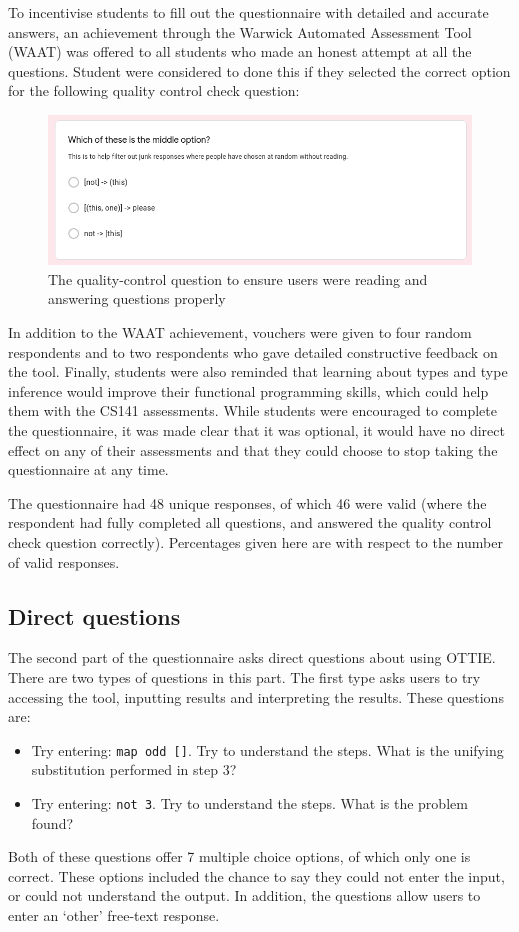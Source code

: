 \documentclass[a4paper,fleqn,oneside,12pt]{report}
\begin{document}
To incentivise students to fill out the questionnaire with detailed and accurate answers, an achievement through the Warwick Automated Assessment Tool (WAAT) was offered to all students who made an honest attempt at all the questions. Student were considered to done this if they selected the correct option for the following quality control check question:

{\centering \begin{figure}[h!]
  \centering
  \includegraphics[width=0.9\linewidth]{images/image32.png}
  \caption{The quality-control question to ensure users were reading and answering questions properly}
\end{figure} \par}

In addition to the WAAT achievement, vouchers were given to four random respondents and to two respondents who gave detailed constructive feedback on the tool. Finally, students were also reminded that learning about types and type inference would improve their functional programming skills, which could help them with the CS141 assessments. While students were encouraged to complete the questionnaire, it was made clear that it was optional, it would have no direct effect on any of their assessments and that they could choose to stop taking the questionnaire at any time.

The questionnaire had 48 unique responses, of which 46 were valid (where the respondent had fully completed all questions, and answered the quality control check question correctly). Percentages given here are with respect to the number of valid responses.

\subsection{Direct questions}\label{id:h.abykou9pzwwh}

The second part of the questionnaire asks direct questions about using OTTIE. There are two types of questions in this part. The first type asks users to try accessing the tool, inputting results and interpreting the results. These questions are:
\begin{itemize}
  \item Try entering: \texttt{map odd []}. Try to understand the steps. What is the unifying substitution performed in step 3?
  \item Try entering: \texttt{not 3}. Try to understand the steps. What is the problem found?
\end{itemize}
Both of these questions offer 7 multiple choice options, of which only one is correct. These options included the chance to say they could not enter the input, or could not understand the output. In addition, the questions allow users to enter an ‘other’ free-text response.
\end{document}
